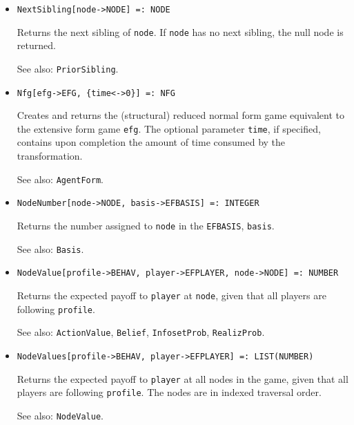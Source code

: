 \begin{itemize}
\item{}
\protect \large \begin{verbatim}
NextSibling[node->NODE] =: NODE 
\end{verbatim}\normalsize

\bd
Returns the next sibling of \verb+node+.  If \verb+node+ has no next
sibling, the null node is returned.
\item [See also:] \verb+PriorSibling+.
\ed

\item{}
\protect \large \begin{verbatim}
Nfg[efg->EFG, {time<->0}] =: NFG 
\end{verbatim}\normalsize

\bd
Creates and returns the (structural) reduced normal form game equivalent
to the extensive form game \verb+efg+.  The optional parameter \verb+time+,
if specified, contains upon completion the amount of time consumed by
the transformation.
\item [See also:] \verb+AgentForm+.
\ed

\item{}
\protect \large \begin{verbatim}
NodeNumber[node->NODE, basis->EFBASIS] =: INTEGER 
\end{verbatim}\normalsize

\bd Returns the number assigned to \verb+node+ in the \verb+EFBASIS+,
\verb+basis+.
\item [See also:] \verb+Basis+. 
\ed

\item{}
\protect \large \begin{verbatim}
NodeValue[profile->BEHAV, player->EFPLAYER, node->NODE] =: NUMBER 
\end{verbatim}\normalsize

\bd
Returns the expected payoff to \verb+player+ at \verb+node+, given
that all players are following \verb+profile+.
\item [See also:] \verb+ActionValue+, \verb+Belief+, \verb+InfosetProb+,
\verb+RealizProb+.
\ed

\item{}
\protect \large \begin{verbatim}
NodeValues[profile->BEHAV, player->EFPLAYER] =: LIST(NUMBER) 
\end{verbatim}\normalsize

\bd 
Returns the expected payoff to \verb+player+ at all nodes in the
game, given that all players are following \verb+profile+.  The nodes
are in indexed traversal order.
\item [See also:] \verb+NodeValue+.  
\ed


\end{itemize}

